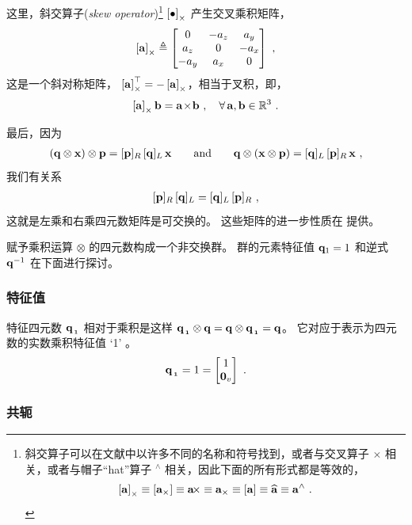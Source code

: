 %
这里，斜交算子(\emph{skew operator})\footnote{斜交算子可以在文献中以许多不同的名称和符号找到，或者与交叉算子 $\times$ 相关，或者与帽子“hat”算子 $^\wedge$ 相关，因此下面的所有形式都是等效的，
$$
\left[{\bf a}\right]_\times \equiv [{\bf a}_\times] \equiv {\bf a}\!\times \equiv {\bf a}_\times \equiv [{\bf a}] \equiv \widehat{{\bf a}} \equiv {\bf a}^\wedge~.
$$
} 
%
$\left[\bullet\right]_\times$ 产生交叉乘积矩阵，
%
\begin{align}
\left[{\bf a}\right]_\times \triangleq \begin{bmatrix}
0 & -a_z & a_y \\
a_z & 0 & -a_x \\
-a_y & a_x & 0
\end{bmatrix}
\label{equ:skew}
~,
\end{align}
%
这是一个斜对称矩阵， $\left[{\bf a}\right]_\times^{\top}=-\left[{\bf a}\right]_\times$，相当于叉积，即， 
%
\begin{align}
\left[{\bf a}\right]_\times{\bf b} = {\bf a}\!\times\!{\bf b}~,\quad \forall\, {\bf a},{\bf b}\in{\mathbb R}^3 ~.  
\end{align}



最后，因为
%
\begin{align}
({\bf q}\otimes{\bf x})\otimes{\bf p} = [{\bf p}]_R\,[{\bf q}]_L\,{\bf x} 
\qquad \textrm{and} \qquad
{\bf q}\otimes({\bf x}\otimes{\bf p}) = [{\bf q}]_L\,[{\bf p}]_R\,{\bf x}
~,
\end{align}
%
我们有关系
%
\begin{align}
[{\bf p}]_R\,[{\bf q}]_L = [{\bf q}]_L\,[{\bf p}]_R~,
\label{equ:PQ_commute}
\end{align}
%
这就是左乘和右乘四元数矩阵是可交换的。
这些矩阵的进一步性质在  提供。


赋予乘积运算 $\otimes$ 的四元数构成一个非交换群。 
群的元素特征值 ${\bf q}_1=1$ 和逆式 ${\bf q}^{-1}$ 在下面进行探讨。

\subsubsection{特征值}

特征四元数 ${\bf q}_{{\,}_{\bf 1}}$ 相对于乘积是这样 ${\bf q}_{{\,}_{\bf 1}}\otimes{\bf q}={\bf q}\otimes{\bf q}_{{\,}_{\bf 1}}={\bf q}$。
它对应于表示为四元数的实数乘积特征值 `1' 。
%
\begin{align*}
{\bf q}_{{\,}_{\bf 1}} = 1 = \begin{bmatrix}
1 \\ {\bf0}_v
\end{bmatrix} ~.
\end{align*}


\subsubsection{共轭}


